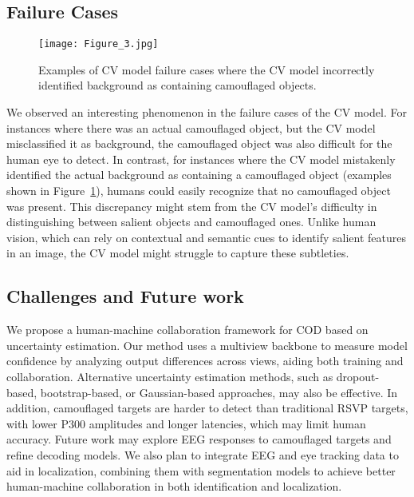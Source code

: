 \documentclass[preprint,12pt,authoryear]{elsarticle}
\begin{document}
\subsection{Failure Cases}
\begin{figure}[!htb]
    \centering
    \texttt{[image: Figure\_3.jpg]} %
    \caption{Examples of CV model failure cases where the CV model incorrectly identified background as containing camouflaged objects.}
    \label{fig:machine_nocam}
\end{figure}
 We observed an interesting phenomenon in the failure cases of the CV model. For instances where there was an actual camouflaged object, but the CV model misclassified it as background, the camouflaged object was also difficult for the human eye to detect. In contrast, for instances where the CV model mistakenly identified the actual background as containing a camouflaged object (examples shown in Figure~\ref{fig:machine_nocam}), humans could easily recognize that no camouflaged object was present. This discrepancy might stem from the CV model's difficulty in distinguishing between salient objects and camouflaged ones. Unlike human vision, which can rely on contextual and semantic cues to identify salient features in an image, the CV model might struggle to capture these subtleties.


\subsection{Challenges and Future work}
We propose a human-machine collaboration framework for COD based on uncertainty estimation. Our method uses a multiview backbone to measure model confidence by analyzing output differences across views, aiding both training and collaboration. Alternative uncertainty estimation methods, such as dropout-based, bootstrap-based, or Gaussian-based approaches, may also be effective. In addition, camouflaged targets are harder to detect than traditional RSVP targets, with lower P300 amplitudes and longer latencies, which may limit human accuracy. Future work may explore EEG responses to camouflaged targets and refine decoding models. We also plan to integrate EEG and eye tracking data to aid in localization, combining them with segmentation models to achieve better human-machine collaboration in both identification and localization.
\end{document}
